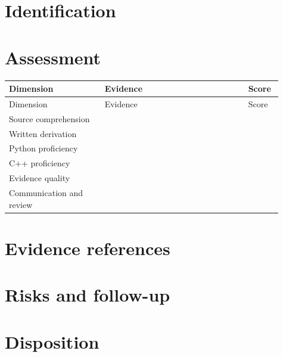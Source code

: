 \documentclass[11pt,letterpaper]{article}
\begin{document}
\tableofcontents
\clearpage
{}
\section{Identification}
\section{Assessment}
\small
\begin{longtable}{@{}p{0.32\linewidth}p{0.48\linewidth}p{0.11\linewidth}@{}}\toprule Dimension & Evidence & Score\\\midrule\endfirsthead\toprule Dimension & Evidence & Score\\\midrule\endhead
Source comprehension & & \\[1.35em]
Written derivation & & \\[1.35em]
Python proficiency & & \\[1.35em]
C++ proficiency & & \\[1.35em]
Evidence quality & & \\[1.35em]
Communication and review & & \\[1.35em]
\bottomrule\end{longtable}\normalsize
\section{Evidence references}
\section{Risks and follow-up}
\section{Disposition}
\end{document}
